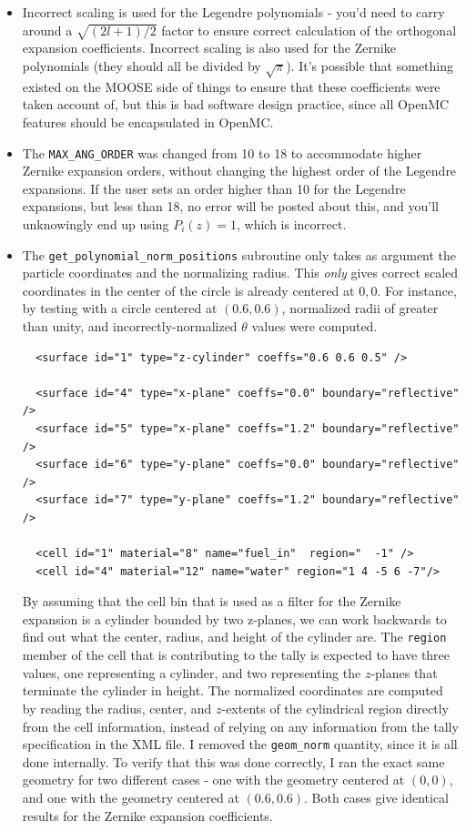 \documentclass[10pt]{article}
\numberwithin{equation}{section} %
\begin{document}
\begin{itemize}
\item Incorrect scaling is used for the Legendre polynomials - you'd need to carry around a \(\sqrt{(2l+1)/2}\) factor to ensure correct calculation of the orthogonal expansion coefficients. Incorrect scaling is also used for the Zernike polynomials (they should all be divided by \(\sqrt{\pi}\)). It's possible that something existed on the MOOSE side of things to ensure that these coefficients were taken account of, but this is bad software design practice, since all OpenMC features should be encapsulated in OpenMC.
\item The {\tt MAX\_ANG\_ORDER} was changed from 10 to 18 to accommodate higher Zernike expansion orders, without changing the highest order of the Legendre expansions. If the user sets an order higher than 10 for the Legendre expansions, but less than 18, no error will be posted about this, and you'll unknowingly end up using \(P_{i}(z)=1\), which is incorrect.
\item The {\tt get\_polynomial\_norm\_positions} subroutine only takes as argument the particle coordinates and the normalizing radius. This {\it only} gives correct scaled coordinates in the center of the circle is already centered at \(0, 0\). For instance, by testing with a circle centered at \((0.6, 0.6)\), normalized radii of greater than unity, and incorrectly-normalized \(\theta\) values were computed. 

\begin{lstlisting}
  <surface id="1" type="z-cylinder" coeffs="0.6 0.6 0.5" />

  <surface id="4" type="x-plane" coeffs="0.0" boundary="reflective" />
  <surface id="5" type="x-plane" coeffs="1.2" boundary="reflective" />
  <surface id="6" type="y-plane" coeffs="0.0" boundary="reflective" />
  <surface id="7" type="y-plane" coeffs="1.2" boundary="reflective" />

  <cell id="1" material="8" name="fuel_in"  region="  -1" />
  <cell id="4" material="12" name="water" region="1 4 -5 6 -7"/>
\end{lstlisting}

By assuming that the cell bin that is used as a filter for the Zernike expansion is a cylinder bounded by two z-planes, we can work backwards to find out what the center, radius, and height of the cylinder are. The {\tt region} member of the cell that is contributing to the tally is expected to have three values, one representing a cylinder, and two representing the \(z\)-planes that terminate the cylinder in height. The normalized coordinates are computed by reading the radius, center, and \(z\)-extents of the cylindrical region directly from the cell information, instead of relying on any information from the tally specification in the XML file. I removed the {\tt geom\_norm} quantity, since it is all done internally. To verify that this was done correctly, I ran the exact same geometry for two different cases - one with the geometry centered at \((0, 0)\), and one with the geometry centered at \((0.6, 0.6)\). Both cases give identical results for the Zernike expansion coefficients.

\end{itemize}
\end{document}
